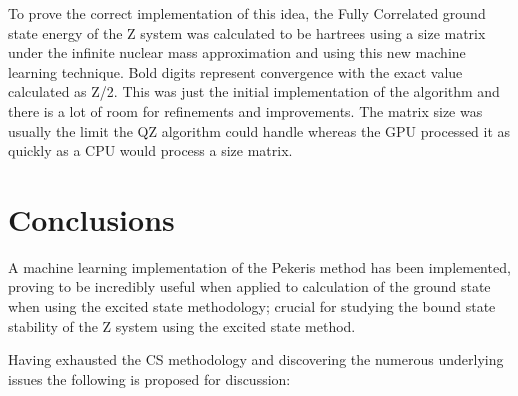 \documentclass[12pt]{article}
\begin{document}
To prove the correct implementation of this idea, the Fully Correlated ground state energy of the Z system was calculated to be  hartrees using a  size matrix under the infinite nuclear mass approximation and using this new machine learning technique. Bold digits represent convergence with the exact value calculated as Z/2. This was just the initial implementation of the algorithm and there is a lot of room for refinements and improvements. The  matrix size was usually the limit the QZ algorithm could handle whereas the GPU processed it as quickly as a CPU would process a  size matrix. 

\section{Conclusions} 

A machine learning implementation of the Pekeris method has been implemented, proving to be incredibly useful when applied to calculation of the ground state when using the excited state methodology; crucial for studying the bound state stability of the Z system using the excited state method.

Having exhausted the CS methodology and discovering the numerous underlying issues the following is proposed for discussion:
\end{document}
